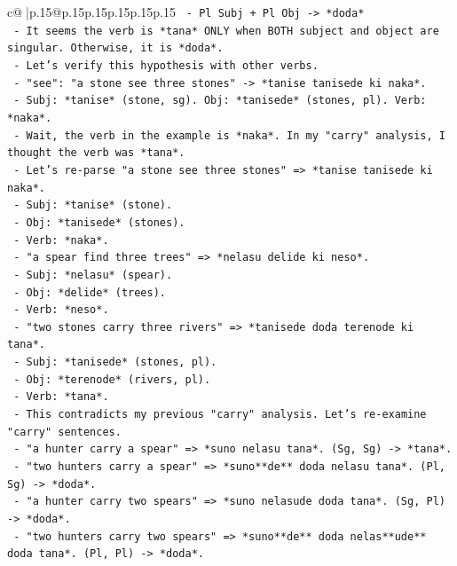 \documentclass{article}
\begin{document}
{\begin{supertabular}{c@{$\;$}|p{.15\linewidth}@{}p{.15\linewidth}p{.15\linewidth}p{.15\linewidth}p{.15\linewidth}p{.15\linewidth}}
{{{\texttt{       {-} Pl Subj + Pl Obj {-}> *doda*} \\
\texttt{     {-} It seems the verb is *tana* ONLY when BOTH subject and object are singular. Otherwise, it is *doda*.} \\
\texttt{     {-} Let's verify this hypothesis with other verbs.} \\
\texttt{     {-} "see": "a stone see three stones" {-}> *tanise tanisede ki naka*.} \\
\texttt{       {-} Subj: *tanise* (stone, sg). Obj: *tanisede* (stones, pl). Verb: *naka*.} \\
\texttt{       {-} Wait, the verb in the example is *naka*. In my "carry" analysis, I thought the verb was *tana*.} \\
\texttt{       {-} Let's re{-}parse "a stone see three stones" => *tanise tanisede ki naka*.} \\
\texttt{         {-} Subj: *tanise* (stone).} \\
\texttt{         {-} Obj: *tanisede* (stones).} \\
\texttt{         {-} Verb: *naka*.} \\
\texttt{       {-} "a spear find three trees" => *nelasu delide ki neso*.} \\
\texttt{         {-} Subj: *nelasu* (spear).} \\
\texttt{         {-} Obj: *delide* (trees).} \\
\texttt{         {-} Verb: *neso*.} \\
\texttt{       {-} "two stones carry three rivers" => *tanisede doda terenode ki tana*.} \\
\texttt{         {-} Subj: *tanisede* (stones, pl).} \\
\texttt{         {-} Obj: *terenode* (rivers, pl).} \\
\texttt{         {-} Verb: *tana*.} \\
\texttt{       {-} This contradicts my previous "carry" analysis. Let's re{-}examine "carry" sentences.} \\
\texttt{       {-} "a hunter carry a spear" => *suno nelasu tana*. (Sg, Sg) {-}> *tana*.} \\
\texttt{       {-} "two hunters carry a spear" => *suno**de** doda nelasu tana*. (Pl, Sg) {-}> *doda*.} \\
\texttt{       {-} "a hunter carry two spears" => *suno nelasude doda tana*. (Sg, Pl) {-}> *doda*.} \\
\texttt{       {-} "two hunters carry two spears" => *suno**de** doda nelas**ude** doda tana*. (Pl, Pl) {-}> *doda*.} \\
}}}
\end{supertabular}}
\end{document}
